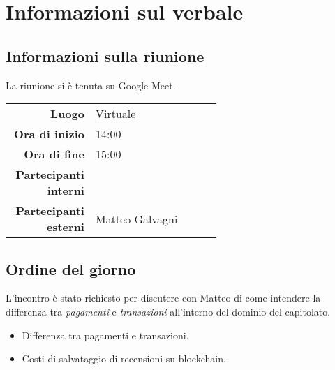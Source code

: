 \section{Informazioni sul verbale}

\subsection{Informazioni sulla riunione}
La riunione si è tenuta su Google Meet.
\begin{center}
	\begin{tabular}{r|p{0.6\linewidth}}
		\toprule
		\textbf{Luogo} & Virtuale \\
		\textbf{Ora di inizio} & 14:00 \\
		\textbf{Ora di fine} & 15:00 \\
		\textbf{Partecipanti interni} & \groupTeam \\
		\textbf{Partecipanti esterni} & Matteo Galvagni
	\end{tabular}
\end{center}

\medskip

\subsection{Ordine del giorno}
L'incontro è stato richiesto per discutere con Matteo di come intendere la differenza tra \textit{pagamenti}  e \textit{transazioni} all'interno del dominio del capitolato. 

\begin{itemize}
	\item Differenza tra pagamenti e transazioni.
	\item Costi di salvataggio di recensioni su blockchain.
\end{itemize}
